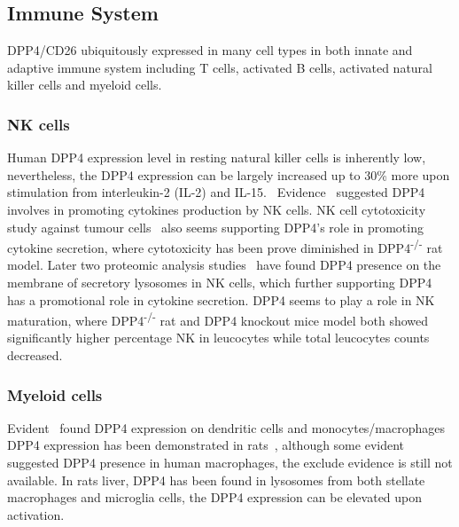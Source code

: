 \subsection{Immune System}
DPP4/CD26 ubiquitously expressed in many cell types in both innate and adaptive immune system including T cells, activated B cells, activated natural killer cells and myeloid cells.~\cite{Abbott1994,Shingu2003,Hong1989,Gutschmidt1981,Dikov2004,Bühling1995,Tanaka1992,Gorrell1991} 

\subsubsection{NK cells}
Human DPP4 expression level in resting natural killer cells is inherently low, nevertheless, the DPP4 expression can be largely increased up to 30\% more upon stimulation from interleukin-2 (IL-2) and IL-15.~\cite{Bühling1994,Biuling1990,Yamabe1997} Evidence~\cite{Madueño1993,Roloff2005} suggested DPP4 involves in promoting cytokines production by NK cells. NK cell cytotoxicity study against tumour cells~\cite{Shingu2003,Frerker2009} also seems supporting DPP4's role in promoting cytokine secretion, where cytotoxicity has been prove diminished in DPP4\textsuperscript{-/-} rat model. Later two proteomic analysis studies~\cite{Topham2009,Casey2007} have found DPP4 presence on the membrane of secretory lysosomes in NK cells, which further supporting DPP4 has a promotional role in cytokine secretion. DPP4 seems to play a role in NK maturation, where DPP4\textsuperscript{-/-} rat and DPP4 knockout mice model both showed significantly higher percentage NK in leucocytes while total leucocytes counts decreased.~\cite{Yan2003,Frerker2009}

\subsubsection{Myeloid cells}
Evident~\cite{Zhong2013,Gliddon2002} found DPP4 expression on dendritic cells and monocytes/macrophages DPP4 expression has been demonstrated in rats~\cite{Epardaud2004, Ellingsen2007}, although some evident~\cite{Shah_2011} suggested DPP4 presence in human macrophages, the exclude evidence is still not available. In rats liver, DPP4 has been found in lysosomes from both stellate macrophages and microglia cells, the DPP4 expression can be elevated upon activation.~\cite{Fukui1990} 

